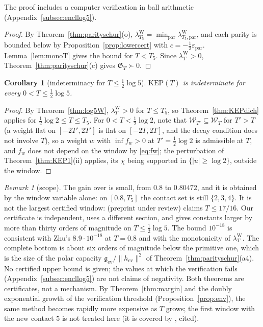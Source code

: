 \documentclass[11pt]{amsart}
\newtheorem{corollary}[theorem]{Corollary}
\theoremstyle{definition}
\theoremstyle{remark}
\newtheorem{remark}[theorem]{Remark}
\newcommand{\lamW}{\lambda^{\mathrm W}_T}
\newcommand{\Wcl}{\mathcal W_T}
\begin{document}
\noindent The proof includes a computer verification in ball arithmetic (Appendix~\ref{subsec:encllog5}).

\begin{proof}
By Theorem~\ref{thm:parityschur}(o), $\lambda^{\mathrm W}_{T_5}=\min_{\mathrm{par}}\lambda^{\mathrm W}_{T_5,\mathrm{par}}$,
and each parity is bounded below by Proposition~\ref{prop:lowercert} with $c=-\frac12\varepsilon_{\mathrm{par}}$.
Lemma~\ref{lem:monoT} gives the bound for $T<T_5$. Since $\lamW>0$, Theorem~\ref{thm:parityschur}(c)
gives $\mathfrak G_T\succ0$.
\end{proof}

\begin{corollary}[indeterminacy for $T\le\frac12\log5$]\label{cor:KEPlog5}
$\mathrm{KEP}(T)$ is indeterminate for every $0<T\le\frac12\log5$.
\end{corollary}
\begin{proof}
By Theorem~\ref{thm:log5W}, $\lamW>0$ for $T\le T_5$, so Theorem~\ref{thm:KEPdich} applies for
$\frac12\log2\le T\le T_5$. For $0<T<\frac12\log2$, note that $\mathcal W_{T'}\subseteq\Wcl$ for $T'>T$ (a weight
flat on $[-2T',2T']$ is flat on $[-2T,2T]$, and the decay condition does not involve $T$), so a weight
$w$ with $\inf f_w>0$ at $T'=\frac12\log2$ is admissible at $T$, and $f_w$ does not depend on the window
by \eqref{eq:fw}; the perturbation of Theorem~\ref{thm:KEP1}(ii) applies, its $\chi$ being supported in
$\{|u|\ge\log2\}$, outside the window.
\end{proof}

\begin{remark}[scope]\label{rem:log5scope}
The gain over \cite[Thm.~1.2]{Zhu2026} is small, from $0.8$ to $0.80472$, and it is obtained by the
window variable alone: on $[0.8,T_5]$ the contact set is still $\{2,3,4\}$. It is not the largest
certified window: \cite{Liu2026} (preprint under review) claims $T\le17/16$. Our certificate is
independent, uses a different section, and gives constants larger by more than thirty orders of magnitude
on $T\le\frac12\log5$. The bound
$10^{-18}$ is consistent with Zhu's $8.9\cdot10^{-18}$ at $T=0.8$ and with the monotonicity of
$\lamW$. The complete bottom is about six orders of magnitude below the primitive one, which is the
size of the polar capacity $\mathfrak g_{\mathrm{ev}}/\|h_{\mathrm{ev}}\|^2$ of
Theorem~\ref{thm:parityschur}(a4). No certified upper bound is given; the values at which the
verification fails (Appendix~\ref{subsec:encllog5}) are not claims of negativity. Both theorems are
certificates, not a mechanism. By Theorem~\ref{thm:margin} and the doubly exponential growth of the
verification threshold (Proposition~\ref{prop:env}), the same method becomes rapidly more expensive as $T$
grows; the first window with the new contact $5$ is not treated here (it is covered by
\cite[Thm.~B]{Liu2026}, cited).
\end{remark}
\end{document}
